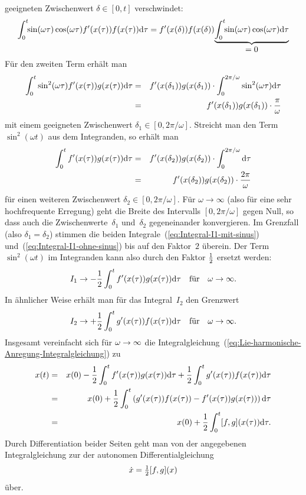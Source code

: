 geeigneten Zwischenwert $\delta\in[0,t]$ verschwindet: 
\[
\int_{0}^{t}\!\!\sin(\omega\tau)\cos(\omega\tau)f^{\prime}(x(\tau))f(x(\tau)){\mathrm{d}}\tau=f^{\prime}(x(\delta))f(x(\delta))\!\underbrace{\int_{0}^{t}\!\!\sin(\omega\tau)\cos(\omega\tau){\mathrm{d}}\tau}_{{\displaystyle =0}}
\]
Für den zweiten Term erhält man
\begin{eqnarray}
\int_{0}^{t}\sin^{2}(\omega\tau)f^{\prime}(x(\tau))g(x(\tau)){\mathrm{d}}\tau & = & f^{\prime}(x(\delta_{1}))g(x(\delta_{1}))\cdot\int_{0}^{2\pi/\omega}\sin^{2}(\omega\tau){\mathrm{d}}\tau\nonumber \\
 & = & f^{\prime}(x(\delta_{1}))g(x(\delta_{1}))\cdot\frac{\pi}{\omega}\label{eq:Integral-I1-mit-sinus}
\end{eqnarray}
mit einem geeigneten Zwischenwert $\delta_{1}\in[0,2\pi/\omega]$.
Streicht man den Term $\sin^{2}(\omega t)$ aus dem Integranden, so
erhält man 
\begin{eqnarray}
\int_{0}^{t}f^{\prime}(x(\tau))g(x(\tau)){\mathrm{d}}\tau & = & f^{\prime}(x(\delta_{2}))g(x(\delta_{2}))\cdot\int_{0}^{2\pi/\omega}{\mathrm{d}}\tau\nonumber \\
 & = & f^{\prime}(x(\delta_{2}))g(x(\delta_{2}))\cdot\frac{2\pi}{\omega}\label{eq:Integral-I1-ohne-sinus}
\end{eqnarray}
für einen weiteren Zwischenwert $\delta_{2}\in[0,2\pi/\omega]$. Für
$\omega\to\infty$ (also für eine sehr hochfrequente Erregung) geht
die Breite des Intervalls $[0,2\pi/\omega]$ gegen Null, so dass auch
die Zwischenwerte~$\delta_{1}$ und~$\delta_{2}$ gegeneinander
konvergieren. Im Grenzfall (also $\delta_{1}=\delta_{2}$) stimmen
die beiden Integrale~(\ref{eq:Integral-I1-mit-sinus}) und~(\ref{eq:Integral-I1-ohne-sinus})
bis auf den Faktor~$2$ überein. Der Term $\sin^{2}(\omega t)$ im
Integranden kann also durch den Faktor $\tfrac{1}{2}$ ersetzt werden: 
\[
I_{1}\to-\frac{1}{2}\int_{0}^{t}f^{\prime}(x(\tau))g(x(\tau)){\mathrm{d}}\tau\quad\text{für}\quad\omega\to\infty.
\]
In ähnlicher Weise erhält man für das Integral~$I_{2}$ den Grenzwert
\[
I_{2}\to+\frac{1}{2}\int_{0}^{t}g^{\prime}(x(\tau))f(x(\tau)){\mathrm{d}}\tau\quad\text{für}\quad\omega\to\infty.
\]
Insgesamt vereinfacht sich für $\text{\ensuremath{\omega\to\infty}}$
die Integralgleichung~(\ref{eq:Lie-harmonische-Anregung-Integralgleichung})
zu
\begin{eqnarray*}
x(t) & = & x(0)-\frac{1}{2}\int_{0}^{t}f^{\prime}(x(\tau))g(x(\tau)){\mathrm{d}}\tau+\frac{1}{2}\int_{0}^{t}g^{\prime}(x(\tau))f(x(\tau)){\mathrm{d}}\tau\\
 & = & x(0)+\frac{1}{2}\int_{0}^{t}\left(g^{\prime}(x(\tau))f(x(\tau))-f^{\prime}(x(\tau))g(x(\tau))\right){\mathrm{d}}\tau\\
 & = & x(0)+\frac{1}{2}\int_{0}^{t}[f,g](x(\tau)){\mathrm{d}}\tau.
\end{eqnarray*}
Durch Differentiation beider Seiten geht man von der angegebenen Integralgleichung
zur der autonomen Differentialgleichung 
\begin{equation}
\dot{x}=\tfrac{1}{2}[f,g](x)\label{eq:Lie-Klammer-harmonisch-Grenzsystem}
\end{equation}
über.

